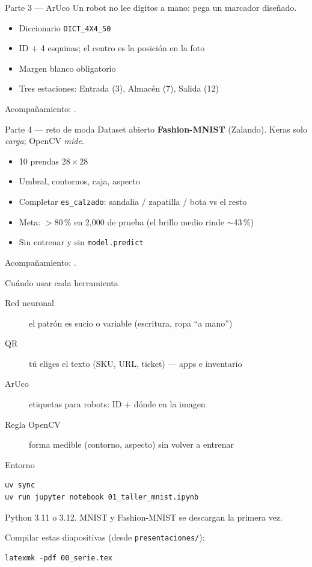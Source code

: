 \documentclass[aspectratio=169]{beamer}
\begin{document}
\begin{frame}{Parte 3 --- ArUco}
  Un robot no lee dígitos a mano: pega un marcador diseñado.

  \begin{itemize}
    \item Diccionario \texttt{DICT\_4X4\_50}
    \item ID + 4 esquinas; el centro es la posición en la foto
    \item Margen blanco obligatorio
    \item Tres estaciones: Entrada (3), Almacén (7), Salida (12)
  \end{itemize}

  Acompañamiento: .
\end{frame}

\begin{frame}{Parte 4 --- reto de moda}
  Dataset abierto \textbf{Fashion-MNIST} (Zalando). Keras solo \emph{carga}; OpenCV \emph{mide}.

  \begin{itemize}
    \item 10 prendas $28\times28$
    \item Umbral, contornos, caja, aspecto
    \item Completar \texttt{es\_calzado}: sandalia / zapatilla / bota vs el resto
    \item Meta: $>$80\,\% en 2{,}000 de prueba (el brillo medio rinde $\sim$43\,\%)
    \item Sin entrenar y sin \texttt{model.predict}
  \end{itemize}

  Acompañamiento: .
\end{frame}

\begin{frame}{Cuándo usar cada herramienta}
  \begin{description}
    \item[Red neuronal] el patrón es sucio o variable (escritura, ropa ``a mano'')
    \item[QR] tú eliges el texto (SKU, URL, ticket) --- apps e inventario
    \item[ArUco] etiquetas para robots: ID + dónde en la imagen
    \item[Regla OpenCV] forma medible (contorno, aspecto) sin volver a entrenar
  \end{description}
\end{frame}

\begin{frame}[fragile]{Entorno}
  \begin{verbatim}
uv sync
uv run jupyter notebook 01_taller_mnist.ipynb
  \end{verbatim}

  Python 3.11 o 3.12. MNIST y Fashion-MNIST se descargan la primera vez.

  Compilar estas diapositivas (desde \texttt{presentaciones/}):
  \begin{verbatim}
latexmk -pdf 00_serie.tex
  \end{verbatim}
\end{frame}
\end{document}
